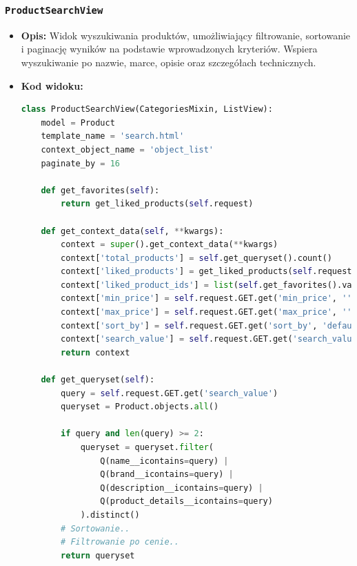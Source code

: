 \documentclass[12pt,a4paper,oneside]{article}
\theoremstyle{definition}
\numberwithin{equation}{section}
\begin{document}
\subsubsection*{\texttt{ProductSearchView}}
\begin{itemize}
    \item \textbf{Opis:} Widok wyszukiwania produktów, umożliwiający filtrowanie, sortowanie i paginację wyników na podstawie wprowadzonych kryteriów. Wspiera wyszukiwanie po nazwie, marce, opisie oraz szczegółach technicznych.
    \item \textbf{Kod widoku:}
    \begin{lstlisting}[language=Python, caption=\texttt{ProductSearchView}]
class ProductSearchView(CategoriesMixin, ListView):
    model = Product
    template_name = 'search.html'
    context_object_name = 'object_list'
    paginate_by = 16

    def get_favorites(self):
        return get_liked_products(self.request)

    def get_context_data(self, **kwargs):
        context = super().get_context_data(**kwargs)
        context['total_products'] = self.get_queryset().count()
        context['liked_products'] = get_liked_products(self.request)
        context['liked_product_ids'] = list(self.get_favorites().values_list('id', flat=True))
        context['min_price'] = self.request.GET.get('min_price', '')
        context['max_price'] = self.request.GET.get('max_price', '')
        context['sort_by'] = self.request.GET.get('sort_by', 'default')
        context['search_value'] = self.request.GET.get('search_value', '')
        return context

    def get_queryset(self):
        query = self.request.GET.get('search_value')
        queryset = Product.objects.all()

        if query and len(query) >= 2:
            queryset = queryset.filter(
                Q(name__icontains=query) |
                Q(brand__icontains=query) |
                Q(description__icontains=query) |
                Q(product_details__icontains=query)
            ).distinct()
        # Sortowanie..
        # Filtrowanie po cenie..
        return queryset
    \end{lstlisting}


\end{itemize}
\end{document}
